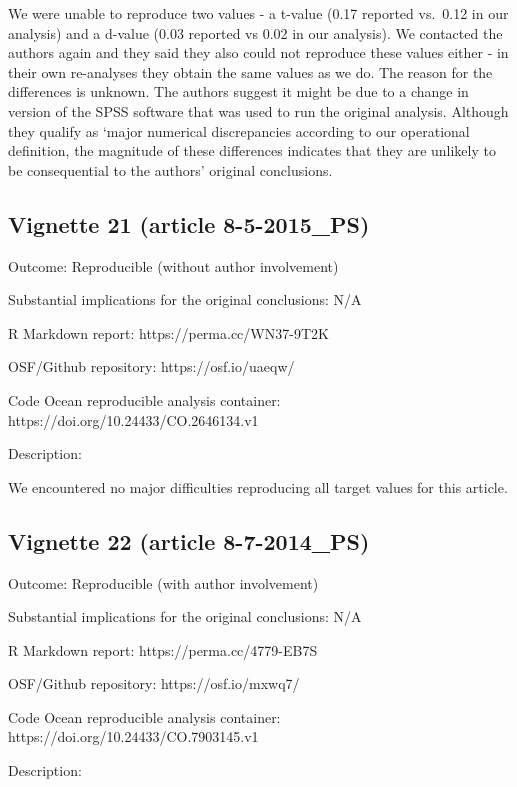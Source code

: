 \begin{appendix}
We were unable to reproduce two values - a t-value (0.17 reported
vs.~0.12 in our analysis) and a d-value (0.03 reported vs 0.02 in our
analysis). We contacted the authors again and they said they also could
not reproduce these values either - in their own re-analyses they obtain
the same values as we do. The reason for the differences is unknown. The
authors suggest it might be due to a change in version of the SPSS
software that was used to run the original analysis. Although they
qualify as `major numerical discrepancies according to our operational
definition, the magnitude of these differences indicates that they are
unlikely to be consequential to the authors' original conclusions.

\hypertarget{vignette-21-article-8-5-2015_ps}{%
\subsection{Vignette 21 (article
8-5-2015\_PS)}\label{vignette-21-article-8-5-2015_ps}}

Outcome: Reproducible (without author involvement)

Substantial implications for the original conclusions: N/A

R Markdown report: https://perma.cc/WN37-9T2K

OSF/Github repository: https://osf.io/uaeqw/

Code Ocean reproducible analysis container:
https://doi.org/10.24433/CO.2646134.v1

Description:

We encountered no major difficulties reproducing all target values for
this article.

\hypertarget{vignette-22-article-8-7-2014_ps}{%
\subsection{Vignette 22 (article
8-7-2014\_PS)}\label{vignette-22-article-8-7-2014_ps}}

Outcome: Reproducible (with author involvement)

Substantial implications for the original conclusions: N/A

R Markdown report: https://perma.cc/4779-EB7S

OSF/Github repository: https://osf.io/mxwq7/

Code Ocean reproducible analysis container:
https://doi.org/10.24433/CO.7903145.v1

Description:


\end{appendix}
